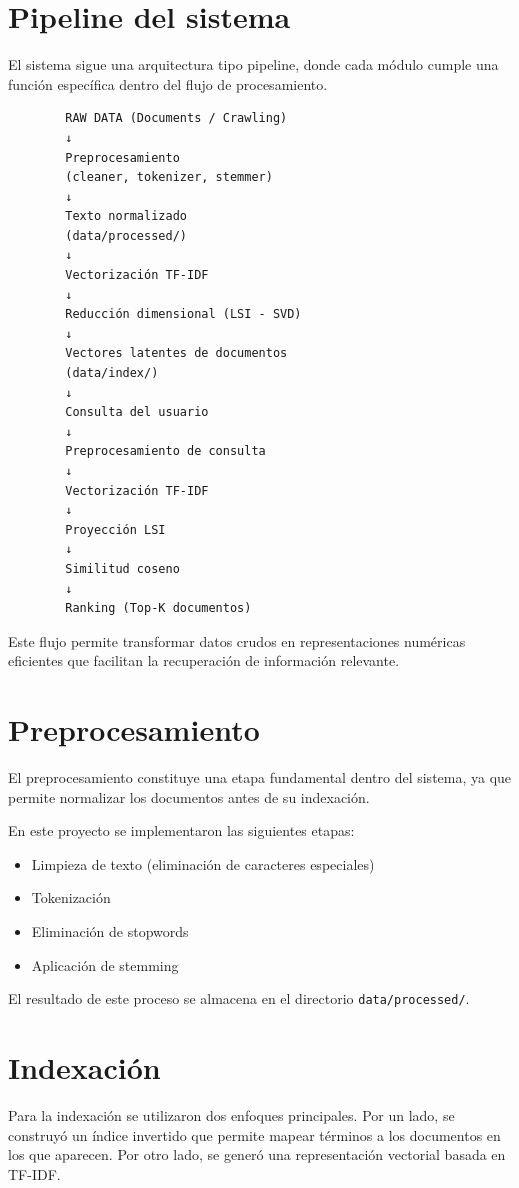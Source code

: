 \documentclass[12pt]{article}
\begin{document}
	\section{Pipeline del sistema}
	
	El sistema sigue una arquitectura tipo pipeline, donde cada módulo cumple una función específica dentro del flujo de procesamiento.
	
	\begin{verbatim}
		RAW DATA (Documents / Crawling)
		↓
		Preprocesamiento
		(cleaner, tokenizer, stemmer)
		↓
		Texto normalizado
		(data/processed/)
		↓
		Vectorización TF-IDF
		↓
		Reducción dimensional (LSI - SVD)
		↓
		Vectores latentes de documentos
		(data/index/)
		↓
		Consulta del usuario
		↓
		Preprocesamiento de consulta
		↓
		Vectorización TF-IDF
		↓
		Proyección LSI
		↓
		Similitud coseno
		↓
		Ranking (Top-K documentos)
	\end{verbatim}
	
	Este flujo permite transformar datos crudos en representaciones numéricas eficientes que facilitan la recuperación de información relevante.
	
	\section{Preprocesamiento}
	
	El preprocesamiento constituye una etapa fundamental dentro del sistema, ya que permite normalizar los documentos antes de su indexación.
	
	En este proyecto se implementaron las siguientes etapas:
	
	\begin{itemize}
		\item Limpieza de texto (eliminación de caracteres especiales)
		\item Tokenización
		\item Eliminación de stopwords
		\item Aplicación de stemming
	\end{itemize}
	
	El resultado de este proceso se almacena en el directorio \texttt{data/processed/}.
	
	\section{Indexación}
	
	Para la indexación se utilizaron dos enfoques principales. Por un lado, se construyó un índice invertido que permite mapear términos a los documentos en los que aparecen. Por otro lado, se generó una representación vectorial basada en TF-IDF.
	
\end{document}
